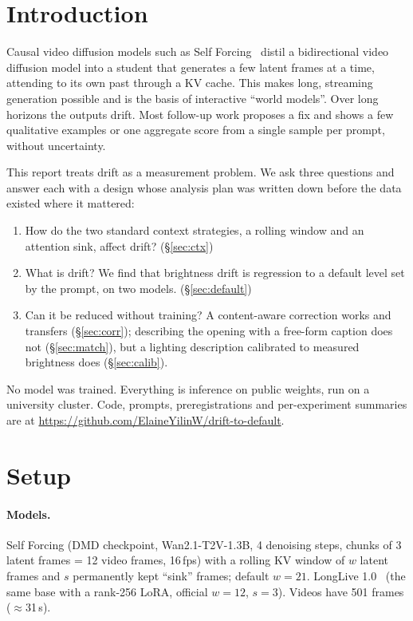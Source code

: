 \documentclass[11pt]{article}
\begin{document}
\section{Introduction}
Causal video diffusion models such as Self Forcing~\cite{selfforcing} distil a bidirectional video diffusion model
into a student that generates a few latent frames at a time, attending to its own past through a KV cache. This makes
long, streaming generation possible and is the basis of interactive ``world models''. Over long horizons the outputs
drift. Most follow-up work proposes a fix and shows a few qualitative examples or one aggregate score from a single
sample per prompt, without uncertainty.

This report treats drift as a measurement problem. We ask three questions and answer each with a design whose analysis
plan was written down before the data existed where it mattered:
\begin{enumerate}
\item How do the two standard context strategies, a rolling window and an attention sink, affect drift? (\S\ref{sec:ctx})
\item What is drift? We find that brightness drift is regression to a default level set by the prompt, on two models. (\S\ref{sec:default})
\item Can it be reduced without training? A content-aware correction works and transfers (\S\ref{sec:corr}); describing the opening with a free-form caption does not (\S\ref{sec:match}), but a lighting description calibrated to measured brightness does (\S\ref{sec:calib}).
\end{enumerate}
No model was trained. Everything is inference on public weights, run on a university cluster. Code, prompts,
preregistrations and per-experiment summaries are at \url{https://github.com/ElaineYilinW/drift-to-default}.

\section{Setup}\label{sec:setup}
\paragraph{Models.} Self Forcing (DMD checkpoint, Wan2.1-T2V-1.3B, 4 denoising steps, chunks of 3 latent frames = 12
video frames, 16\,fps) with a rolling KV window of $w$ latent frames and $s$ permanently kept ``sink'' frames; default
$w{=}21$. LongLive 1.0~\cite{longlive} (the same base with a rank-256 LoRA, official $w{=}12$, $s{=}3$). Videos have
501 frames ($\approx$31\,s).
\end{document}
